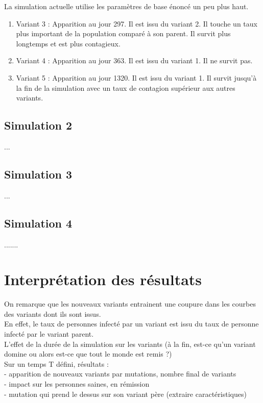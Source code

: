 \documentclass{article}
\begin{document}
\noindent
La simulation actuelle utilise les paramètres de base énoncé un peu plus haut. \\

\begin{enumerate}
    \item Variant 3 : Apparition au jour 297. Il est issu du variant 2. Il touche un taux plus important de la population comparé à son parent. Il survit plus longtemps et est plus contagieux.
    \item Variant 4 : Apparition au jour 363. Il est issu du variant 1. Il ne survit pas.
    \item Variant 5 : Apparition au jour 1320. Il est issu du variant 1. Il survit jusqu'à la fin de la simulation avec un taux de contagion supérieur aux autres variants. \\
\end{enumerate}


\subsection{Simulation 2}
...
\subsection{Simulation 3}
...
\subsection{Simulation 4}
.......

\section{Interprétation des résultats}

On remarque que les nouveaux variants entrainent une coupure dans les courbes des variants dont ils sont issus. \\ 
En effet, le taux de personnes infecté par un variant est issu du taux de personne infecté par le variant parent. \\

L'effet de la durée de la simulation sur les variants (à la fin, est-ce qu'un variant domine ou alors est-ce que tout le monde est remis ?) \\

Sur un temps T défini, résultats :\\
- apparition de nouveaux variants par mutations, nombre final de variants\\
- impact sur les personnes saines, en rémission\\
- mutation qui prend le dessus sur son variant père (extraire caractéristiques)\\
\end{document}

